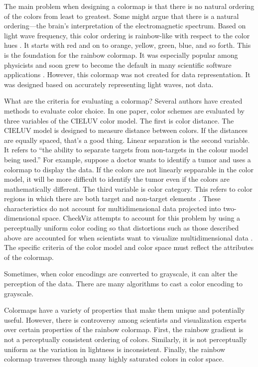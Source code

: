 \documentclass[journal]{IEEEtran}
\begin{document}
The main problem when designing a colormap is that there is no natural ordering of the colors
from least to greatest. Some might argue that there is a natural
ordering---the brain's interpretation of the electromagnetic spectrum.
Based on light wave frequency, this color ordering is rainbow-like with respect
to the color hues \cite{colormapping}. It starts with red and on to orange,
yellow, green, blue, and so forth. This is the foundation for the rainbow colormap.
It was especially popular among physicists and soon grew to become the default
in many scientific software applications \cite{rainbowstill,matlab}. However,
this colormap was not created for data representation. It was designed based
on accurately representing light waves, not data.

What are the criteria for evaluating a colormap? Several authors have created
methods to evaluate color
choice. In one paper, color schemes are evaluated by
three variables of the CIELUV color model. The first
is color distance. The CIELUV model is designed to
measure distance between colors. If the distances are
equally spaced, that’s a good thing. Linear separation
is the second variable. It refers to “the ability to separate targets
from non-targets in the colour model being
used.” For example, suppose a doctor wants to identify
a tumor and uses a colormap to display the data. If the
colors are not linearly sepparable in the color model, it
will be more difficult to identify the tumor even if the
colors are mathematically different. The third variable
is color category. This refers to color regions in which
there are both target and non-target elements \cite{colorchoice}.
 These characteristics do not account for multidimensional data projected into two-dimensional
space. CheckViz attempts to account for this problem
by using a perceptually uniform color coding so that
distortions such as those described above are accounted for when 
scientists want to visualize multidimensional data \cite{checkviz}.
The specific criteria of the color
model and color space must reflect the attributes of the colormap.
\par
Sometimes, when color encodings are converted to
grayscale, it can alter the perception of the data. There
are many algorithms to cast a color encoding to grayscale.


Colormaps have a variety of properties that make them unique and potentially
useful. However, there is controversy among scientists and visualization
experts over certain properties of the rainbow colormap. First, the rainbow
gradient is not a perceptually consistent ordering of colors. Similarly, it
is not perceptually uniform as the variation in lightness is inconsistent.
Finally, the rainbow colormap traverses through many
highly saturated colors in color space.
\end{document}
